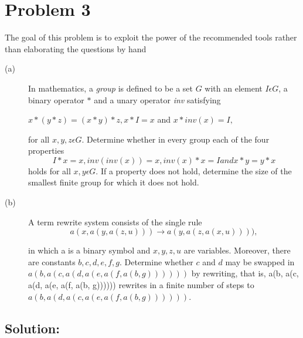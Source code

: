 \section*{Problem 3}

The goal of this problem is to exploit the power of the recommended tools rather than elaborating the questions by hand

\begin{description}
  \item[(a)] In mathematics, a \emph{group} is defined to be a set $G$ with an element $I \epsilon G$, a binary operator $\ast$ and a unary operator \emph{inv} satisfying
      \begin{center}
      $ x \ast(y \ast z)=(x\ast y) \ast z, x \ast I = x $ and $ x \ast inv(x) = I, $
      \end{center}
      for all $x, y, z \epsilon G$. Determine whether in every group each of the four properties
      \[  I \ast x = x, inv(inv(x)) = x, inv(x) \ast x = I and x \ast y = y \ast x  \]
      holds for all $x, y \epsilon G$. If a property does not hold, determine the size of the smallest finite group for which it does not hold.
  \item[(b)] A term rewrite system consists of the single rule
  \[ a(x, a(y, a(z, u))) \rightarrow a(y, a(z, a(x, u)))), \]

  in which a is a binary symbol and $x, y, z, u$ are variables. Moreover, there are constants $b, c, d, e, f, g$. Determine whether $c$ and $d$ may be swapped in $a(b, a(c, a(d, a(e, a(f, a(b, g))))))$ by rewriting, that is, a(b, a(c, a(d, a(e, a(f, a(b, g)))))) rewrites in a finite number of steps to $a(b, a(d, a(c, a(e, a(f, a(b, g))))))$.

\end{description}

\vspace{4mm}

\subsection*{Solution:}

